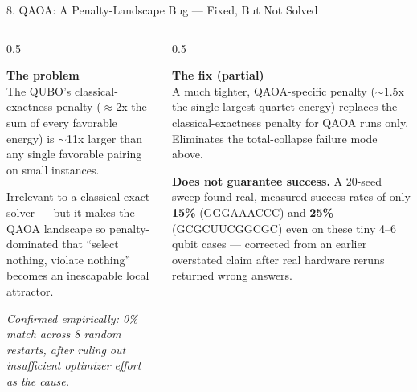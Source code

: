 \documentclass[aspectratio=169,10pt]{beamer}
\begin{document}
\begin{frame}{8. QAOA: A Penalty-Landscape Bug --- Fixed, But Not Solved}
  \begin{columns}[T]
    \begin{column}{0.5\textwidth}
      \begin{cardbox}
      \textbf{\color{badred}The problem}\\[5pt]
      \footnotesize The QUBO's classical-exactness penalty ($\approx$2x the sum of every favorable energy) is $\sim$11x larger than any single favorable pairing on small instances.
      \vspace{4pt}

      Irrelevant to a classical exact solver --- but it makes the QAOA landscape so penalty-dominated that ``select nothing, violate nothing'' becomes an inescapable local attractor.
      \vspace{4pt}

      \textit{Confirmed empirically: 0\% match across 8 random restarts, after ruling out insufficient optimizer effort as the cause.}
      \end{cardbox}
    \end{column}
    \begin{column}{0.5\textwidth}
      \begin{greenbox}
      \textbf{\color{accent}The fix (partial)}\\[5pt]
      \footnotesize A much tighter, QAOA-specific penalty ($\sim$1.5x the single largest quartet energy) replaces the classical-exactness penalty for QAOA runs only. Eliminates the total-collapse failure mode above.
      \vspace{4pt}

      \textbf{Does not guarantee success.} A 20-seed sweep found real, measured success rates of only \textbf{15\%} (GGGAAACCC) and \textbf{25\%} (GCGCUUCGGCGC) even on these tiny 4--6 qubit cases --- corrected from an earlier overstated claim after real hardware reruns returned wrong answers.
      \end{greenbox}
    \end{column}
  \end{columns}
\end{frame}
\end{document}
